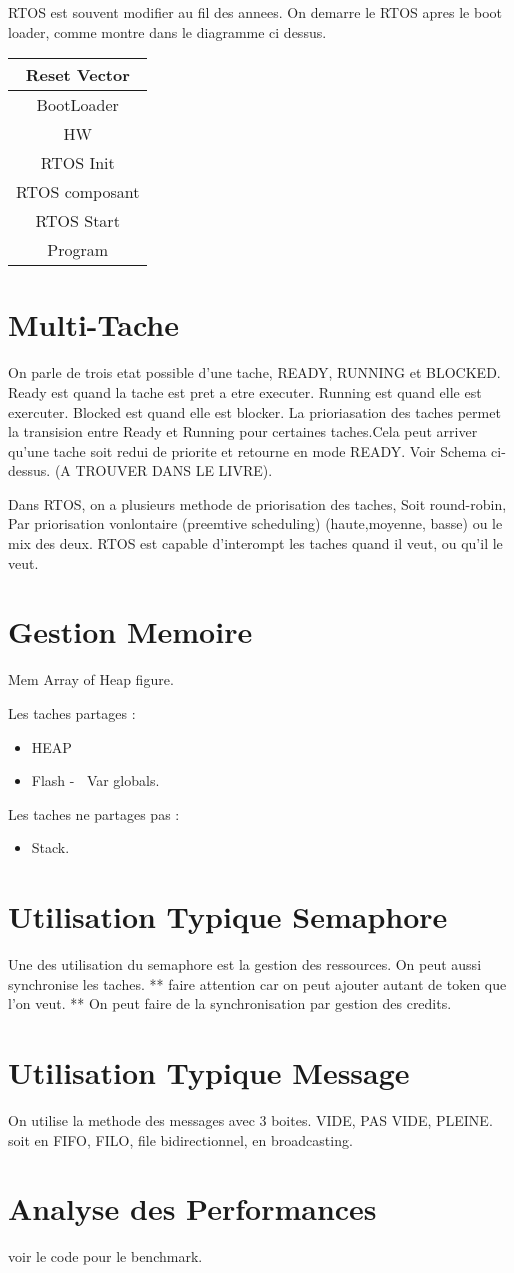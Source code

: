 \documentclass{article}
\begin{document}
RTOS est souvent modifier au fil des annees. On demarre le RTOS apres le boot loader, comme montre dans le diagramme ci dessus.
\newline 
\begin{center}
\begin{tabular}{|c|}
\hline
Reset Vector \\ \hline
BootLoader \\ \hline
HW \\ \hline
RTOS Init\\ \hline
RTOS composant \\ \hline
RTOS Start\\ \hline
Program\\
\hline
\end{tabular}
\end{center}

\section{Multi-Tache}
On parle de trois etat possible d'une tache, READY, RUNNING et BLOCKED. Ready est quand la tache est pret a etre executer. Running est quand elle est exercuter. Blocked est quand elle est blocker. La prioriasation des taches permet la transision entre Ready et Running pour certaines taches.Cela peut arriver qu'une tache soit redui de priorite et retourne en mode READY. Voir Schema ci-dessus. (A TROUVER DANS LE LIVRE).
\newline
\par
\noindent
Dans RTOS, on a plusieurs methode de priorisation des taches, Soit round-robin,
Par priorisation vonlontaire (preemtive scheduling) (haute,moyenne, basse) ou le mix des deux. RTOS est capable d'interompt les taches quand il veut, ou qu'il le veut.
\section{Gestion Memoire}
\begin{center}
	Mem Array of Heap figure.
\end{center}
Les taches partages :
\begin{itemize}
\item HEAP
\item Flash - $\>$ Var globals.
\end{itemize}
Les taches ne partages pas :
\begin{itemize}
\item Stack.
\end{itemize}
\section{Utilisation Typique Semaphore}
Une des utilisation du semaphore est la gestion des ressources. On peut aussi synchronise les taches. ** faire attention car on peut ajouter autant de token que l'on veut. **
On peut faire de la synchronisation par gestion des credits.  
\section{Utilisation Typique Message}
On utilise la methode des messages avec 3 boites. VIDE, PAS VIDE, PLEINE. soit en FIFO, FILO, file bidirectionnel, en broadcasting.
\section{Analyse des Performances}
voir le code pour le benchmark.
\end{document}
